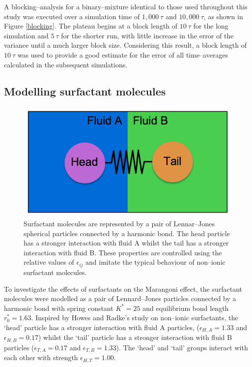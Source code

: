A blocking--analysis for a binary--mixture identical to those used throughout this study was executed over a simulation time of $1,000\ \tau$ and $10,000\ \tau$, as shown in Figure \ref{blocking}.
The plateau begins at a block length of $10\ \tau$ for the long simulation and $5\ \tau$ for the shorter run, with little increase in the error of the variance until a much larger block size.
Considering this result, a block length of $10\ \tau$ was used to provide a good estimate for the error of all time--averages calculated in the subsequent simulations.
\FloatBarrier

\subsection{Modelling surfactant molecules}\label{ModellingSurfactants}
\begin{figure}[h]
\centering
\includegraphics[scale=0.4]{surfactant.png}
\caption{Surfactant molecules are represented by a pair of Lennar--Jones spherical particles connected by a harmonic bond. 
The head particle has a stronger interaction with fluid A whilst the tail has a stronger interaction with fluid B.
These properties are controlled using the relative values of $\epsilon_{ij}$ and imitate the typical behaviour of non--ionic surfactant molecules.
 }
\label{surfactant}
\end{figure}
To investigate the effects of surfactants on the Marangoni effect, the surfactant molecules were modelled as a pair of Lennard--Jones particles connected by a harmonic bond with spring constant $K^{*} = 25$ and equilibrium bond length $r^{*}_{0}=1.63$.
Inspired by Howes and Radke's study on non--ionic surfactants,\cite{HowesSurfactant} the `head' particle has a stronger interaction with fluid A particles, ($\epsilon_{H, A} = 1.33$ and $\epsilon_{H, B} = 0.17$) whilst the `tail' particle has a stronger interaction with fluid B particles ($\epsilon_{T, A} = 0.17$ and $\epsilon_{T, B} = 1.33$).
The `head' and `tail' groups interact with each other with strength $\epsilon_{H, T} = 1.00$.
\FloatBarrier

